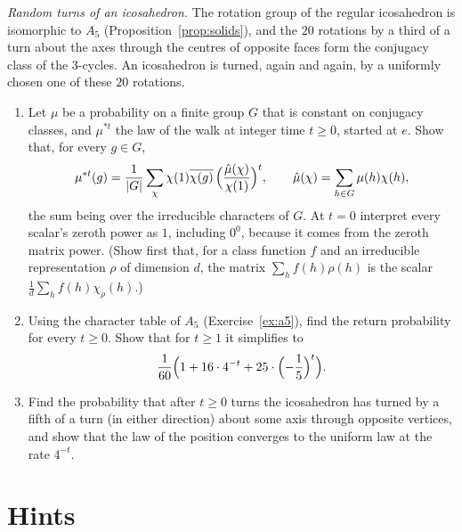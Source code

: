 \begin{exercise}[$\star\star\star$]\label{pb:dodecaturns}
\emph{Random turns of an icosahedron.} The rotation group of the regular icosahedron is isomorphic to $A_5$ (Proposition~\ref{prop:solids}), and the
$20$ rotations by a third of a turn about the axes through the centres of opposite faces form the conjugacy class of the
$3$-cycles. An icosahedron is turned, again and again, by a uniformly chosen one of these $20$ rotations.
\begin{enumerate}[label=(\alph*)]
\item Let $\mu$ be a probability on a finite group $G$ that is constant on conjugacy classes, and $\mu^{*t}$ the law of the walk at integer time
$t\ge0$, started at $e$. Show that, for every $g\in G$,
\[
\mu^{*t}(g)=\frac1{|G|}\sum_\chi\chi(1)\overline{\chi(g)}\,\Bigl(\frac{\hat\mu(\chi)}{\chi(1)}\Bigr)^t,\qquad\hat\mu(\chi)=\sum_{h\in G}\mu(h)\chi(h),
\]
the sum being over the irreducible characters of $G$. At $t=0$ interpret every scalar's zeroth power as $1$, including $0^0$, because it comes from the zeroth matrix power. (Show first that, for a class function $f$ and an irreducible representation $\rho$ of
dimension $d$, the matrix $\sum_hf(h)\rho(h)$ is the scalar $\frac1d\sum_hf(h)\chi_\rho(h)$.)
\item Using the character table of $A_5$ (Exercise~\ref{ex:a5}), find the return probability for every $t\ge0$. Show that for $t\ge1$ it simplifies to
\[
\frac1{60}\Bigl(1+16\cdot4^{-t}+25\cdot\Bigl(-\frac15\Bigr)^t\Bigr).
\]
\item Find the probability that after $t\ge0$ turns the icosahedron has turned by a fifth of a turn (in either direction) about some
axis through opposite vertices, and show that the law of the position converges to the uniform law at the rate $4^{-t}$.
\end{enumerate}
\end{exercise}

\section{Hints}

